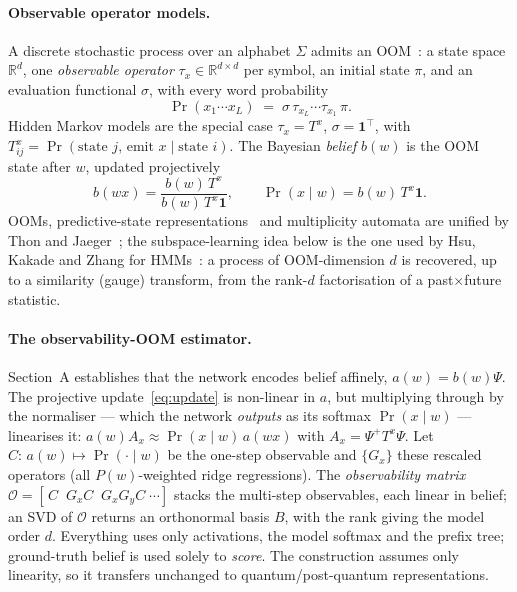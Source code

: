 \documentclass[11pt]{article}
\begin{document}
\paragraph{Observable operator models.} A discrete stochastic process over an alphabet $\Sigma$
admits an OOM~\cite{jaeger2000}: a state space $\mathbb{R}^{d}$, one \emph{observable operator}
$\tau_x\in\mathbb{R}^{d\times d}$ per symbol, an initial state $\pi$, and an evaluation
functional $\sigma$, with every word probability
\begin{equation}
\Pr(x_{1}\cdots x_{L}) \;=\; \sigma\,\tau_{x_L}\cdots\tau_{x_1}\,\pi .
\label{eq:oom}
\end{equation}
Hidden Markov models are the special case $\tau_x=T^x$, $\sigma=\mathbf{1}^\top$, with
$T^x_{ij}=\Pr(\text{state }j,\,\text{emit }x\mid\text{state }i)$. The Bayesian \emph{belief}
$b(w)$ is the OOM state after $w$, updated projectively
\begin{equation}
b(wx)=\frac{b(w)\,T^{x}}{b(w)\,T^{x}\mathbf{1}},\qquad
\Pr(x\mid w)=b(w)\,T^{x}\mathbf{1}.
\label{eq:update}
\end{equation}
OOMs, predictive-state representations~\cite{littman2001} and multiplicity automata are unified
by Thon and Jaeger~\cite{thon2015}; the subspace-learning idea below is the one used by Hsu,
Kakade and Zhang for HMMs~\cite{hsu2012}: a process of OOM-dimension $d$ is recovered, up to a
similarity (gauge) transform, from the rank-$d$ factorisation of a past$\times$future statistic.

\paragraph{The observability-OOM estimator.} Section~A establishes that the network encodes
belief affinely, $a(w)=b(w)\Psi$. The projective update~\eqref{eq:update} is non-linear in $a$,
but multiplying through by the normaliser --- which the network \emph{outputs} as its softmax
$\Pr(x\mid w)$ --- linearises it: $a(w)A_x\approx\Pr(x\mid w)\,a(wx)$ with $A_x=\Psi^{+}T^{x}\Psi$.
Let $C:\,a(w)\mapsto\Pr(\cdot\mid w)$ be the one-step observable and $\{G_x\}$ these rescaled
operators (all $P(w)$-weighted ridge regressions). The \emph{observability matrix}
$\mathcal{O}=[\,C\;\;G_xC\;\;G_xG_yC\;\cdots]$ stacks the multi-step observables, each linear in
belief; an SVD of $\mathcal{O}$ returns an orthonormal basis $B$, with the rank giving the model
order $d$. Everything uses only activations, the model softmax and the prefix tree; ground-truth
belief is used solely to \emph{score}. The construction assumes only linearity, so it transfers
unchanged to quantum/post-quantum representations.
\end{document}
